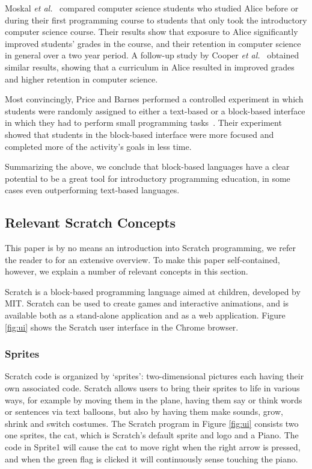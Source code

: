 \documentclass{sig-alternate}
\begin{document}
Moskal \emph{et al.}~\cite{b._moskal_evaluating_2005} compared computer science students who studied Alice before or during their first programming course to students that only took the introductory computer science course. Their results show that exposure to Alice significantly improved students' grades in the course, and their retention in computer science in general over a two year period. A follow-up study by Cooper \emph{et al.}~\cite{cooper_teaching_2003} obtained similar results, showing that a curriculum in Alice resulted in improved grades and higher retention in computer science.

Most convincingly, Price and Barnes performed a controlled experiment in which students were randomly assigned to either a text-based or a block-based interface in  which they had to perform small programming tasks~\cite{price_comparing_2015}. Their experiment showed that students in the block-based interface were more focused and completed more of the activity's goals in less time.

Summarizing the above, we conclude that block-based languages have a clear potential to be a great tool for introductory programming education, in some cases even outperforming text-based languages.

\subsection{Relevant Scratch Concepts}
\label{sec:scratch}
This paper is by no means an introduction into Scratch programming, we refer the reader to \cite{brennan_creative_2014} for an extensive overview. To make this paper self-contained, however, we explain a number of relevant concepts in this section. 

Scratch is a block-based programming language aimed at children, developed by MIT. Scratch can be used to create games and interactive animations, and is available both as a stand-alone application and as a web application. Figure \ref{fig:ui} shows the Scratch user interface in the Chrome browser.

\subsubsection{Sprites}
Scratch code is organized by `sprites': two-dimensional pictures each having their own associated code. Scratch allows users to bring their sprites to life in various ways, for example by moving them in the plane, having them say or think words or sentences via text balloons, but also by having them make sounds, grow, shrink and switch costumes. The Scratch program in Figure \ref{fig:ui} consists two one sprites, the cat, which is Scratch's default sprite and logo and a Piano. The code in Sprite1 will cause the cat to move right when the right arrow is pressed, and when the green flag is clicked it will continuously sense touching the piano.
\end{document}
